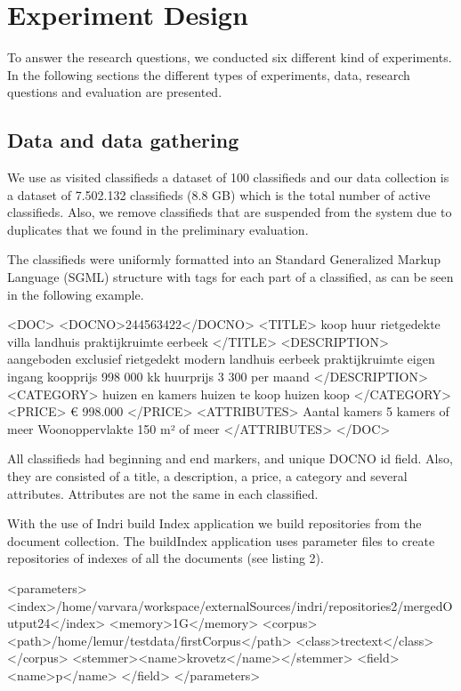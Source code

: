 \chapter{Experiment Design}
To answer the research questions, we conducted six different kind of experiments. In the following sections the different types of experiments, data, research questions and evaluation are presented.



\section{Data and data gathering}

We use as visited classifieds a dataset of 100 classifieds and our data collection is a dataset of  7.502.132 classifieds (8.8 GB) which is the total number of active classifieds. Also, we remove classifieds that are suspended from the system due to duplicates that we found in the preliminary evaluation.

The classifieds were uniformly formatted into an Standard Generalized Markup Language (SGML) structure with tags for each part of a classified, as can be seen in the following example.



{\small
\begin{code}[caption={SGML formated classified}]
<DOC>
	<DOCNO>244563422</DOCNO>
	 <TITLE>
		 koop huur rietgedekte villa landhuis praktijkruimte eerbeek
	</TITLE>
	<DESCRIPTION>
		 aangeboden exclusief rietgedekt modern landhuis eerbeek praktijkruimte eigen ingang koopprijs   998 000   kk   huurprijs   3 300   per maand
	</DESCRIPTION>
	<CATEGORY>
		 huizen en kamers huizen te koop  huizen koop
	</CATEGORY>
	<PRICE>
		€ 998.000
	</PRICE>
	<ATTRIBUTES>
	  Aantal kamers 5 kamers of meer Woonoppervlakte 150 m² of meer
	</ATTRIBUTES>
</DOC>
\end{code}
}


All classifieds had beginning and end markers, and unique DOCNO id field. Also, they are consisted of a title, a description, a price, a category and several attributes. Attributes are not the same in each classified.

With the use of Indri build Index application we build repositories from the document collection. The buildIndex application uses parameter files to create repositories of indexes of all the documents (see listing 2).

\begin{code}[caption={Build index parameter file}]
 <parameters>
	<index>/home/varvara/workspace/externalSources/indri/repositories2/mergedOutput24</index>
    <memory>1G</memory>
    <corpus>
      <path>/home/lemur/testdata/firstCorpus</path>
      <class>trectext</class>
    </corpus>
    <stemmer><name>krovetz</name></stemmer>
    <field>
      <name>p</name>
    </field>
  </parameters>
\end{code}


